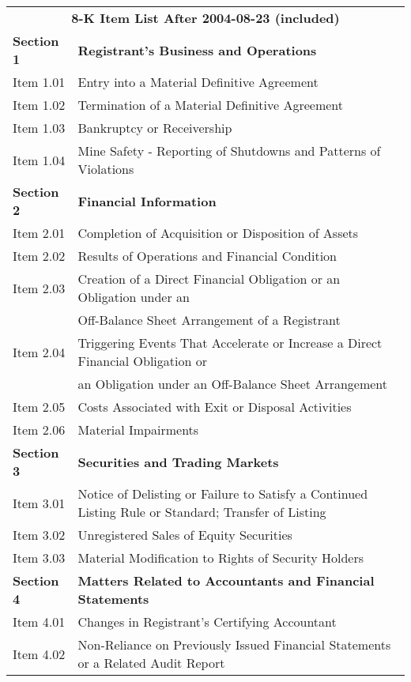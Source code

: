 \begin{table}[H]
	\begin{tabular}{ll}
    \multicolumn{2}{c}{\textbf{8-K Item List After 2004-08-23 (included)}} \\
    \textbf{Section 1} & \textbf{Registrant's Business and Operations} \\
    Item 1.01 & Entry into a Material Definitive Agreement \\
    Item 1.02 & Termination of a Material Definitive Agreement \\
    Item 1.03 & Bankruptcy or Receivership \\
    Item 1.04 & Mine Safety - Reporting of Shutdowns and Patterns of Violations \\
    \textbf{Section 2} & \textbf{Financial Information} \\
    Item 2.01 & Completion of Acquisition or Disposition of Assets \\
    Item 2.02 & Results of Operations and Financial Condition \\
    Item 2.03 & Creation of a Direct Financial Obligation or an Obligation under an \\
              & Off-Balance Sheet Arrangement of a Registrant \\
    Item 2.04 & Triggering Events That Accelerate or Increase a Direct Financial Obligation or \\
              & an Obligation under an Off-Balance Sheet Arrangement \\
    Item 2.05 & Costs Associated with Exit or Disposal Activities \\
    Item 2.06 & Material Impairments \\
    \textbf{Section 3} & \textbf{Securities and Trading Markets} \\
    Item 3.01 & Notice of Delisting or Failure to Satisfy a Continued Listing Rule or Standard; Transfer of Listing \\
    Item 3.02 & Unregistered Sales of Equity Securities \\
    Item 3.03 & Material Modification to Rights of Security Holders \\
    \textbf{Section 4} & \textbf{Matters Related to Accountants and Financial Statements} \\
    Item 4.01 & Changes in Registrant's Certifying Accountant \\
    Item 4.02 & Non-Reliance on Previously Issued Financial Statements or a Related Audit Report \\

\end{tabular}
\end{table}

